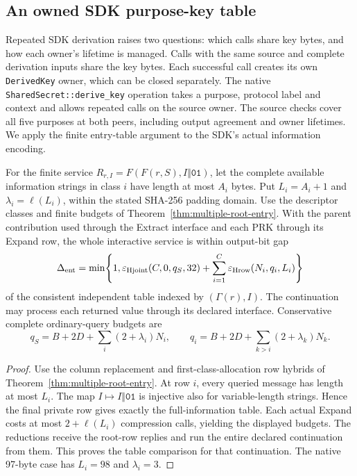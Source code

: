 \subsection{An owned SDK purpose-key table}
\label{sec:sdk-purpose-connection}

Repeated SDK derivation raises two questions: which calls share key
bytes, and how each owner's lifetime is managed. Calls with the
same source and complete derivation inputs share the key bytes. Each
successful call creates its own \texttt{DerivedKey} owner, which can be
closed separately. The native
\texttt{SharedSecret::derive\_key} operation takes a purpose, protocol
label and context and allows repeated calls on the source owner. The
source checks cover all five purposes at both peers, including output
agreement and owner lifetimes. We apply the finite entry-table
argument to the SDK's actual information encoding.

\begin{lemma}
\label{lem:entry-information-length}
For the finite service $R_{r,I}=F(F(r,S),I\Vert\mathtt{01})$, let the
complete available information strings in class $i$ have length at most
$A_i$ bytes. Put $L_i=A_i+1$ and $\lambda_i=\ell(L_i)$, within the stated
SHA-256 padding domain. Use the descriptor classes and finite budgets of
Theorem~\ref{thm:multiple-root-entry}. With the parent contribution used
through the Extract interface and each PRK through its Expand row, the
whole interactive service is within output-bit gap
\begin{equation}
 \Delta_{\rm ent}=\min\!\left\{1,
 \varepsilon_{\rm Hjoint}(C,0,q_S,32)
 +\sum_{i=1}^{C}\varepsilon_{\rm Hrow}(N_i,q_i,L_i)\right\}
 \label{eq:entry-information-length}
\end{equation}
of the consistent independent table indexed by $(\Gamma(r),I)$.
The continuation may process each returned value through its declared
interface. Conservative complete ordinary-query budgets are
\[
 q_S=B+2D+\sum_i(2+\lambda_i)N_i,\qquad
 q_i=B+2D+\sum_{k>i}(2+\lambda_k)N_k.
\]
\end{lemma}
\begin{proof}
Use the column replacement and first-class-allocation row hybrids of
Theorem~\ref{thm:multiple-root-entry}. At row $i$, every queried message
has length at most $L_i$. The map $I\mapsto I\Vert\mathtt{01}$ is injective
also for variable-length strings. Hence the final private row gives exactly
the full-information table. Each actual Expand costs at most
$2+\ell(L_i)$ compression calls, yielding the displayed budgets.
The reductions receive the root-row replies and run the entire declared
continuation from them. This proves the table comparison for that
continuation. The native 97-byte case has $L_i=98$ and $\lambda_i=3$.
\end{proof}

